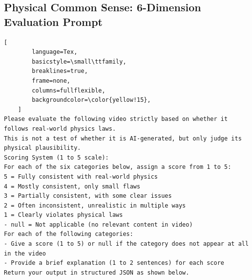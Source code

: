 \begin{tcolorbox}[
    promptstyle, 
    width=\linewidth, 
    breakable
] 
    \subsection*{Physical Common Sense: 6-Dimension Evaluation Prompt}

    \begin{lstlisting}[
        language=Tex, 
        basicstyle=\small\ttfamily,
        breaklines=true,
        frame=none, 
        columns=fullflexible,
        backgroundcolor=\color{yellow!15}, 
    ]
Please evaluate the following video strictly based on whether it follows real-world physics laws.
This is not a test of whether it is AI-generated, but only judge its physical plausibility.
Scoring System (1 to 5 scale):
For each of the six categories below, assign a score from 1 to 5:
5 = Fully consistent with real-world physics
4 = Mostly consistent, only small flaws
3 = Partially consistent, with some clear issues
2 = Often inconsistent, unrealistic in multiple ways
1 = Clearly violates physical laws
- null = Not applicable (no relevant content in video)
For each of the following categories:
- Give a score (1 to 5) or null if the category does not appear at all in the video
- Provide a brief explanation (1 to 2 sentences) for each score
Return your output in structured JSON as shown below.


\end{lstlisting}
\end{tcolorbox}
